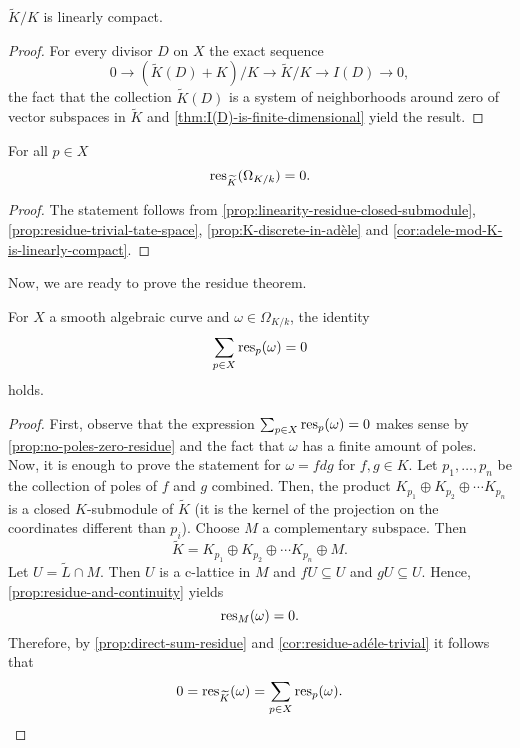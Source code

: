\begin{corollary}\label{cor:adele-mod-K-is-linearly-compact}
	$\widetilde{K}/K$ is linearly compact.
\end{corollary}
\begin{proof}
	For every divisor $D$ on $X$ the exact sequence
	\[
	0 \to (\widetilde{K}(D) + K)/ K \to \widetilde{K}/K \to I(D) \to 0,
	\]
	the fact that the collection $\widetilde{K}(D)$ is a system of neighborhoods around zero of vector subspaces in $\widetilde{K}$ and \cref{thm:I(D)-is-finite-dimensional} yield the result.
\end{proof}
\begin{corollary}\label{cor:residue-adéle-trivial}
	For all $p\in X$
	\[
		\operatorname{res}_{\widetilde{K}}(\Omega_{K/k}) = 0.
	\]
\end{corollary}
\begin{proof}
	The statement follows from \cref{prop:linearity-residue-closed-submodule}, \cref{prop:residue-trivial-tate-space}, \cref{prop:K-discrete-in-adèle} and \cref{cor:adele-mod-K-is-linearly-compact}.
\end{proof}

Now, we are ready to prove the residue theorem. 
\begin{theorem}\label{thm:residue-theorem}
	For $X$ a smooth algebraic curve and $\omega \in \Omega_{K/k}$, the identity 
	\[
		\sum_{p\in X}\operatorname{res}_{p}(\omega) = 0
	\]
	holds. 
\end{theorem}
\begin{proof}
	First, observe that the expression $\sum_{p\in X}\operatorname{res}_{p}(\omega) = 0$ makes sense by \cref{prop:no-poles-zero-residue} and the fact that $\omega$ has a finite amount of poles. Now, it is enough to prove the statement for $\omega = fdg$ for $f,g \in K$. Let $p_{1}, \ldots, p_{n}$ be the collection of poles of $f$ and $g$ combined. Then, the product $K_{p_{1}} \oplus K_{p_{2}} \oplus \cdots K_{p_{n}}$ is a closed $K$-submodule of $\widetilde{K}$ (it is the kernel of the projection on the coordinates different than $p_{i}$). Choose $M$ a complementary subspace. Then
	\[
		\widetilde{K} = K_{p_{1}} \oplus K_{p_{2}} \oplus \cdots K_{p_{n}} \oplus M. 
	\] 
	Let $U = \widetilde{L} \cap M$. Then $U$ is a c-lattice in $M$ and $fU \subseteq U$ and $gU \subseteq U$. Hence, \cref{prop:residue-and-continuity} yields
	\[
		\operatorname{res}_{M}(\omega) = 0.
	\]
	Therefore, by \cref{prop:direct-sum-residue} and \cref{cor:residue-adéle-trivial} it follows that
	\[
		0 = \operatorname{res}_{\widetilde{K}}(\omega) = \sum_{p\in X}\operatorname{res}_{p}(\omega).
	\]
\end{proof}
